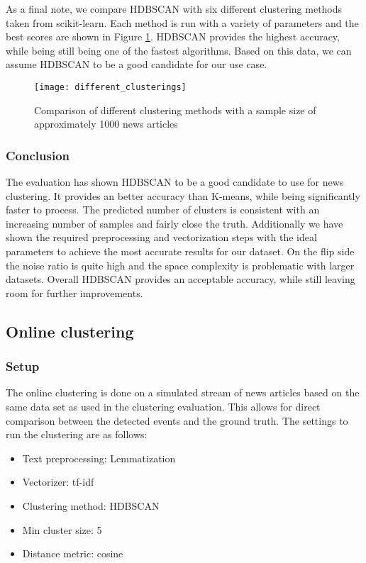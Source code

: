 As a final note, we compare HDBSCAN with six different clustering methods taken from scikit-learn. Each method is run with a variety of parameters and the best scores are shown in Figure \ref{fig:different_clusterings}. HDBSCAN provides the highest accuracy, while being still being one of the fastest algorithms. Based on this data, we can assume HDBSCAN to be a good candidate for our use case.

\begin{figure}[h]
    \centering
    \texttt{[image: different\_clusterings]}
    \caption{Comparison of different clustering methods with a sample size of approximately 1000 news articles}
    \label{fig:different_clusterings}
\end{figure}

\subsubsection{Conclusion}

The evaluation has shown HDBSCAN to be a good candidate to use for news clustering. It provides an better accuracy than K-means, while being significantly faster to process. The predicted number of clusters is consistent with an increasing number of samples and fairly close the truth. Additionally we have shown the required preprocessing and vectorization steps with the ideal parameters to achieve the most accurate results for our dataset. On the flip side the noise ratio is quite high and the space complexity is problematic with larger datasets. Overall HDBSCAN provides an acceptable accuracy, while still leaving room for further improvements.

\subsection{Online clustering}

\subsubsection{Setup}

The online clustering is done on a simulated stream of news articles based on the same data set as used in the clustering evaluation. This allows for direct comparison between the detected events and the ground truth. The settings to run the clustering are as follows:

\begin{itemize}
    \item Text preprocessing: Lemmatization
    \item Vectorizer: tf-idf
    \item Clustering method: HDBSCAN
    \item Min cluster size: 5
    \item Distance metric: cosine
\end{itemize}


